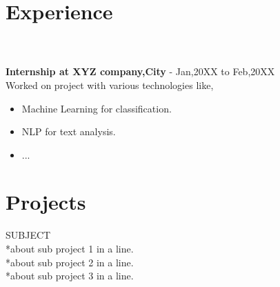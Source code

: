 \documentclass[letterpaper]{twentysecondcv} %
\begin{document}







\section{Experience}
\\~\\
\textbf{Internship at XYZ company,City} - Jan,20XX to Feb,20XX\\
Worked on project with various technologies like,
\begin{itemize}
\item Machine Learning for classification.
\item NLP for text analysis.
\item ...
\end{itemize}

\section{Projects}

\begin{twenty} %
	{
	SUBJECT
	\\*about sub project 1 in a line.
	\\*about sub project 2 in a line.
	\\*about sub project 3 in a line.
	}
	
\end{twenty}
\end{document}

